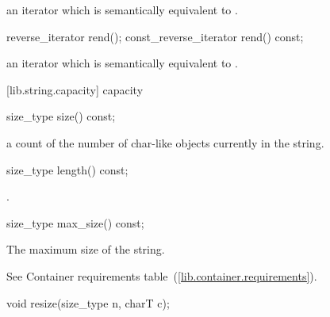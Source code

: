 \begin{itemdescr}
\pnum
\returns
an iterator which is semantically equivalent to
.
\end{itemdescr}

%
%
\begin{itemdecl}
reverse_iterator       rend();
const_reverse_iterator rend() const;
\end{itemdecl}

\begin{itemdescr}
\pnum
\returns
an iterator which is semantically equivalent to
.
\end{itemdescr}

[lib.string.capacity]{ capacity}

%
%
\begin{itemdecl}
size_type size() const;
\end{itemdecl}

\begin{itemdescr}
\pnum
\returns
a count of the number of char-like objects currently in the string.
\end{itemdescr}

%
%
\begin{itemdecl}
size_type length() const;
\end{itemdecl}

\begin{itemdescr}
\pnum
\returns
{}.
\end{itemdescr}

%
%
\begin{itemdecl}
size_type max_size() const;
\end{itemdecl}

\begin{itemdescr}
\pnum
\returns
The maximum size of the string.

\pnum
\note
See Container requirements table~(\ref{lib.container.requirements}).
\end{itemdescr}

%
%
\begin{itemdecl}
void resize(size_type n, charT c);
\end{itemdecl}

